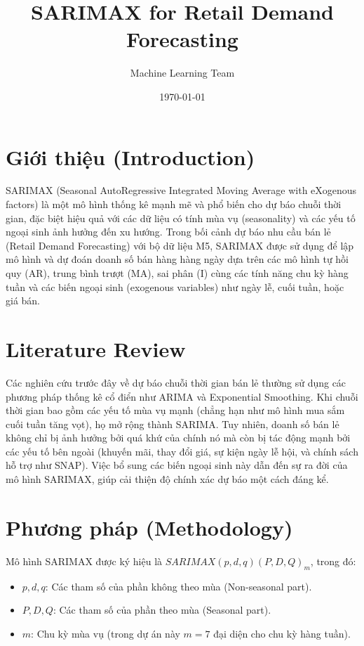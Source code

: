 \documentclass{article}
\title{SARIMAX for Retail Demand Forecasting}
\author{Machine Learning Team}
\date{\today}
\begin{document}
\maketitle

\section{Giới thiệu (Introduction)}
SARIMAX (Seasonal AutoRegressive Integrated Moving Average with eXogenous factors) là một mô hình thống kê mạnh mẽ và phổ biến cho dự báo chuỗi thời gian, đặc biệt hiệu quả với các dữ liệu có tính mùa vụ (seasonality) và các yếu tố ngoại sinh ảnh hưởng đến xu hướng. Trong bối cảnh dự báo nhu cầu bán lẻ (Retail Demand Forecasting) với bộ dữ liệu M5, SARIMAX được sử dụng để lập mô hình và dự đoán doanh số bán hàng hàng ngày dựa trên các mô hình tự hồi quy (AR), trung bình trượt (MA), sai phân (I) cùng các tính năng chu kỳ hàng tuần và các biến ngoại sinh (exogenous variables) như ngày lễ, cuối tuần, hoặc giá bán.

\section{Literature Review}
Các nghiên cứu trước đây về dự báo chuỗi thời gian bán lẻ thường sử dụng các phương pháp thống kê cổ điển như ARIMA và Exponential Smoothing. Khi chuỗi thời gian bao gồm các yếu tố mùa vụ mạnh (chẳng hạn như mô hình mua sắm cuối tuần tăng vọt), họ mở rộng thành SARIMA. Tuy nhiên, doanh số bán lẻ không chỉ bị ảnh hưởng bởi quá khứ của chính nó mà còn bị tác động mạnh bởi các yếu tố bên ngoài (khuyến mãi, thay đổi giá, sự kiện ngày lễ hội, và chính sách hỗ trợ như SNAP). Việc bổ sung các biến ngoại sinh này dẫn đến sự ra đời của mô hình SARIMAX, giúp cải thiện độ chính xác dự báo một cách đáng kể.

\section{Phương pháp (Methodology)}
Mô hình SARIMAX được ký hiệu là $SARIMAX(p, d, q)(P, D, Q)_m$, trong đó:
\begin{itemize}
    \item $p, d, q$: Các tham số của phần không theo mùa (Non-seasonal part).
    \item $P, D, Q$: Các tham số của phần theo mùa (Seasonal part).
    \item $m$: Chu kỳ mùa vụ (trong dự án này $m = 7$ đại diện cho chu kỳ hàng tuần).
\end{itemize}
\end{document}
